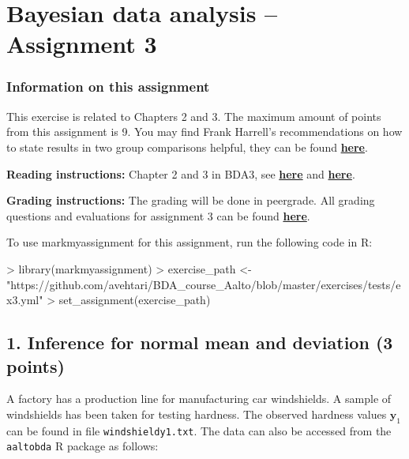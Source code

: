\documentclass[a4paper,11pt]{article}
\begin{document}

\thispagestyle{empty}

\section*{Bayesian data analysis -- Assignment 3}



\subsubsection*{Information on this assignment}

This exercise is related to Chapters 2 and 3. The maximum amount of points from this assignment is 9. You may find Frank Harrell's recommendations on how to state results in two group comparisons helpful, they can be found \href{http://www.fharrell.com/2017/10/bayesian-vs-frequentist-statements.html}{\textbf{here}}.

\textbf{Reading instructions:} Chapter 2 and 3 in BDA3, see \href{https://github.com/avehtari/BDA_course_Aalto/blob/master/chapter_notes/BDA_notes_ch2.pdf}{\textbf{here}} and \href{https://github.com/avehtari/BDA_course_Aalto/blob/master/chapter_notes/BDA_notes_ch3.pdf}{\textbf{here}}.

\textbf{Grading instructions:} The grading will be done in peergrade. All grading questions and evaluations for assignment 3 can be found \href{https://github.com/avehtari/BDA_course_Aalto/blob/master/exercises/ex3_rubric.md}{\textbf{here}}.

To use markmyassignment for this assignment, run the following code in R:


\begin{Schunk}
\begin{Sinput}
> library(markmyassignment)
> exercise_path <- 
    "https://github.com/avehtari/BDA_course_Aalto/blob/master/exercises/tests/ex3.yml"
> set_assignment(exercise_path)
\end{Sinput}
\end{Schunk}


\subsection*{1. Inference for normal mean and deviation (3 points)}

A factory has a production line for manufacturing car windshields. 
A sample of windshields has been taken for testing hardness. The
observed hardness values $\mathbf{y}_1$ can be found in file 
{\tt windshieldy1.txt}. The data
can also be accessed from the {\tt aaltobda} R package as follows:
\end{document}
